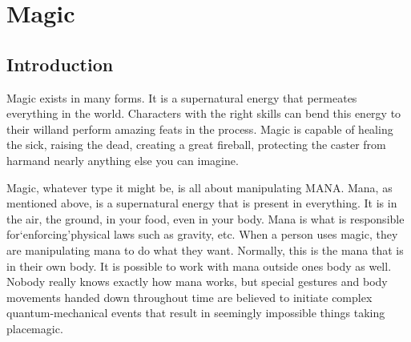 \documentclass[twoside]{book}
\begin{document}
\begin{multicols}{2}
    


\hspace{-2ex}
\vspace{1ex}


    


\hspace{-2ex}
\vspace{1ex}


    


\hspace{-2ex}
\vspace{1ex}


    


\hspace{-2ex}
\vspace{1ex}


    
\end{multicols}
  
    

\chapter{Magic}
    
    

\section{Introduction}
    
    {  
    Magic exists in many forms. It is a supernatural energy that permeates everything in the world. Characters with the right skills can bend this energy to their willand perform amazing feats in the process. Magic is capable of healing the sick, raising the dead, creating a great fireball, protecting the caster from harmand nearly anything else you can imagine.
    }
  
    {  
    Magic, whatever type it might be, is all about manipulating MANA. Mana, as mentioned above, is a supernatural energy that is present in everything. It is in the air, the ground, in your food, even in your body. Mana is what is responsible for`enforcing'physical laws such as gravity, etc. When a person uses magic, they are manipulating mana to do what they want. Normally, this is the mana that is in their own body. It is possible to work with mana outside ones body as well. Nobody really knows exactly how mana works, but special gestures and body movements handed down throughout time are believed to initiate complex quantum-mechanical events that result in seemingly impossible things taking placemagic.
    }
  
\end{document}
